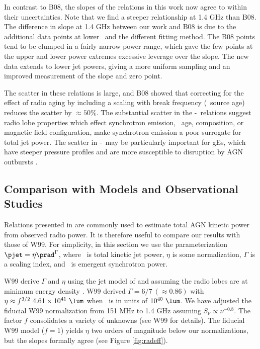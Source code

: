 \documentclass[12pt, preprint]{aastex}
\begin{document}
In contrast to B08, the slopes of the relations in this work now agree
to within their uncertainties. Note that we find a steeper
relationship at 1.4 GHz than B08. The difference in slope at 1.4 GHz
between our work and B08 is due to the additional data points at lower
\pjet\ and the different fitting method. The B08 points tend to be
clumped in a fairly narrow power range, which gave the few points at
the upper and lower power extremes excessive leverage over the
slope. The new data extends to lower jet powers, giving a more uniform
sampling and an improved measurement of the slope and zero point.

The scatter in these relations is large, and B08 showed that
correcting for the effect of radio aging by including a scaling with
break frequency (\ie\ source age) reduces the scatter by $\approx
50\%$. The substantial scatter in the \pjet-\prad\ relations suggest
radio lobe properties which effect synchrotron emission, \eg\ age,
composition, or magnetic field configuration, make synchrotron
emission a poor surrogate for total jet power. The scatter in
\pjet-\prad\ may be particularly important for gEs, which have steeper
pressure profiles and are more susceptible to disruption by AGN
outbursts \citep{2006MNRAS.372.1161W, 2008ApJ...687L..53P}.

\subsection{Comparison with Models and Observational Studies}
\label{sec:models}

Relations presented in \citet[][hereafter W99]{w99} are commonly used
to estimate total AGN kinetic power from observed radio power. It is
therefore useful to compare our results with those of W99. For
simplicity, in this section we use the parameterization $\pjet = \eta
\prad^{\Gamma}$, where \pjet\ is total kinetic jet power, $\eta$ is
some normalization, $\Gamma$ is a scaling index, and \prad\ is
emergent synchrotron power.

W99 derive $\Gamma$ and $\eta$ using the jet model of
\citet{1991MNRAS.250..581F} and assuming the radio lobes are at
minimum energy density \citep[see][for
  details]{1980ARA&A..18..165M}. W99 derived $\Gamma = 6/7 ~(\approx
0.86)$ with $\eta \approx f^{3/2}~4.61 \times 10^{41} ~\lum$ when
\prad\ is in units of $10^{40} ~\lum$. We have adjusted the fiducial
W99 normalization from 151 MHz to 1.4 GHz assuming $S_{\nu} \propto
\nu^{-0.8}$. The factor $f$ consolidates a variety of unknowns (see
W99 for details). The fiducial W99 model ($f=1$) yields $\eta$ two
orders of magnitude below our normalizations, but the slopes formally
agree (see Figure \ref{fig:radeff}).
\end{document}
